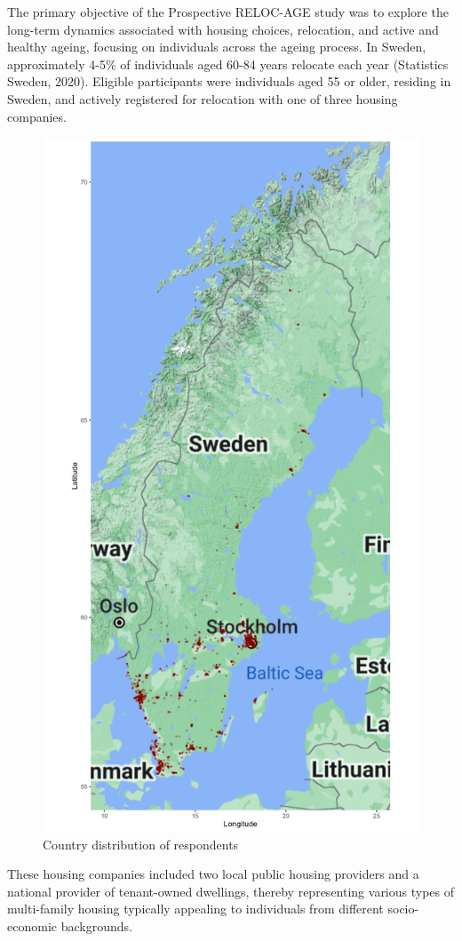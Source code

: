 \documentclass[3p,11pt ]{elsarticle}
\begin{document}
The primary objective of the Prospective RELOC-AGE study was to explore the long-term dynamics associated with housing choices, relocation, and active and healthy ageing, focusing on individuals across the ageing process.
In Sweden, approximately 4-5\% of individuals aged 60-84 years relocate each year (Statistics Sweden, 2020).
Eligible participants were individuals aged 55 or older, residing in Sweden, and actively registered for relocation with one of three housing companies.
\begin{figure}
\centering
\includegraphics[scale=0.25]{figures/survey_location.png}
\caption{Country distribution of respondents \label{fig:map}}
\end{figure}
These housing companies included two local public housing providers and a national provider of tenant-owned dwellings, thereby representing various types of multi-family housing typically appealing to individuals from different socio-economic backgrounds.
\cite{caplanMeasuringHeterogeneousPreferences2021}
\end{document}
